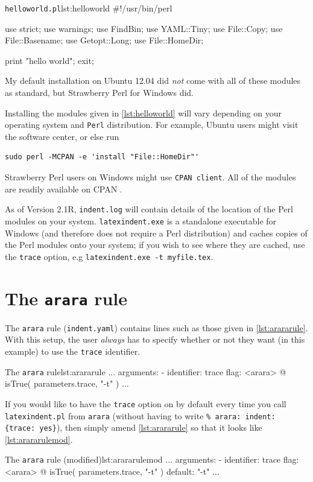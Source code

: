 \documentclass[11pt]{article}
\begin{document}
\begin{cmhlistings}[language=Perl]{\lstinline!helloworld.pl!}{lst:helloworld}
#!/usr/bin/perl

use strict;
use warnings;
use FindBin;
use YAML::Tiny;
use File::Copy;
use File::Basename;
use Getopt::Long;
use File::HomeDir;

print "hello world";
exit;
\end{cmhlistings}
My default installation on Ubuntu 12.04 did \emph{not} come
with all of these modules as standard, but Strawberry Perl for Windows \cite{strawberryperl}
did.

Installing the modules given in \cref{lst:helloworld} will vary depending on your
operating system and \lstinline!Perl! distribution. For example, Ubuntu users
might visit the software center, or else run
\begin{lstlisting}[numbers=none]
sudo perl -MCPAN -e 'install "File::HomeDir"'
\end{lstlisting}
Strawberry Perl users on Windows might use
\lstinline!CPAN client!. All of the modules are readily available on CPAN \cite{cpan}.

As of Version 2.1R,  \lstinline!indent.log! will contain details of the location
of the Perl modules on your system.  \lstinline!latexindent.exe! is a standalone
executable for Windows (and therefore does not require a Perl distribution) and caches copies of the Perl modules onto your system; if you
wish to see where they are cached, use the  \lstinline!trace! option, e.g  \lstinline!latexindent.exe -t myfile.tex!.

\section{The \lstinline!arara! rule}
The \lstinline!arara! rule (\lstinline!indent.yaml!) contains lines such as those
given in \cref{lst:arararule}. With this setup, the user \emph{always} has
to specify whether or not they want (in this example) to use the \lstinline!trace!
identifier.
\begin{cmhlistings}[style=yaml,numbers=none]{The \lstinline!arara! rule}{lst:arararule}
...
arguments:
- identifier: trace
  flag: <arara> @{ isTrue( parameters.trace, "-t" ) }
...
\end{cmhlistings}

If you would like to have the \lstinline!trace! option on by default every time you
call \lstinline!latexindent.pl! from \lstinline!arara! (without having to write \lstinline!% arara: indent: {trace: yes}!), then simply
amend \cref{lst:arararule} so that it looks like \cref{lst:arararulemod}.
\begin{cmhlistings}[style=yaml,numbers=none]{The \lstinline!arara! rule (modified)}{lst:arararulemod}
...
arguments:
- identifier: trace
  flag: <arara> @{ isTrue( parameters.trace, "-t" ) }
  default: "-t"
...
\end{cmhlistings}
\end{document}
